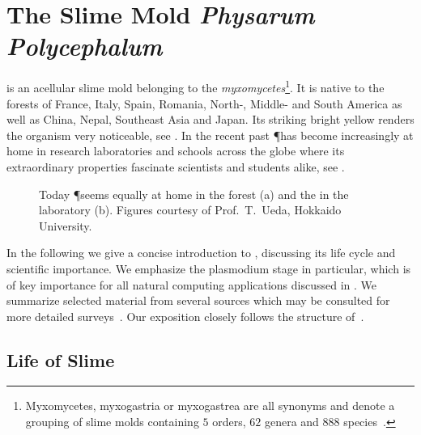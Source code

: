 \section{The Slime Mold \textit{Physarum Polycephalum}}

	\Pp is an acellular slime mold belonging to the \emph{myxomycetes}\footnote{Myxomycetes, myxogastria or myxogastrea are all synonyms and denote a grouping of slime molds containing $5$ orders, $62$ genera and $888$ species~\cite{ainsworth2008ainsworth}.}. It is native to the forests of France, Italy, Spain, Romania, North-, Middle- and South America as well as China, Nepal, Southeast Asia and Japan. Its striking bright yellow renders the organism very noticeable, see . In the recent past \P has become increasingly at home in research laboratories and schools across the globe where its extraordinary properties fascinate scientists and students alike, see .

	\begin{figure}[!htp]
		\centering
		\qquad
		\caption[\P exploring various environments]{Today \P seems equally at home in the forest (a) and the in the laboratory (b). Figures courtesy of Prof.~T.~Ueda, Hokkaido University.}
		\label{fig:exploration}
	\end{figure}

	In the following we give a concise introduction to \Pp, discussing its life cycle and scientific importance. We emphasize the plasmodium stage in particular, which is of key importance for all natural computing applications discussed in . We summarize selected material from several sources which may be consulted for more detailed surveys~\cite{stephenson1994myxomycetes,nowotny2000myxomyceten,grube2016physarum,Sauer1986,Mayne2016,howard1931life}. Our exposition closely follows the structure of~\cite{nowotny2000myxomyceten}.
	
	\FloatBarrier
	
	\subsection{Life of Slime}


